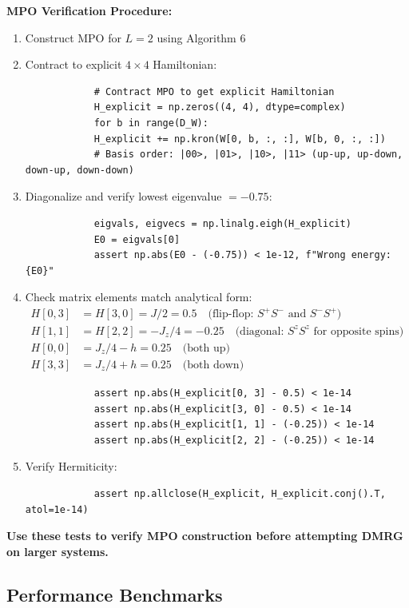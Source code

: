 \documentclass[aps,prb,onecolumn,scriptaddress]{revtex4-2}
\begin{document}
		\textbf{MPO Verification Procedure:}
		\begin{enumerate}
		\item Construct MPO for $L=2$ using Algorithm 6
		\item Contract to explicit $4 \times 4$ Hamiltonian:
		\begin{verbatim}
			# Contract MPO to get explicit Hamiltonian
			H_explicit = np.zeros((4, 4), dtype=complex)
			for b in range(D_W):
			H_explicit += np.kron(W[0, b, :, :], W[b, 0, :, :])
			# Basis order: |00>, |01>, |10>, |11> (up-up, up-down, down-up, down-down)
		\end{verbatim}
		
		\item Diagonalize and verify lowest eigenvalue $= -0.75$:
		\begin{verbatim}
			eigvals, eigvecs = np.linalg.eigh(H_explicit)
			E0 = eigvals[0]
			assert np.abs(E0 - (-0.75)) < 1e-12, f"Wrong energy: {E0}"
		\end{verbatim}
		
		\item Check matrix elements match analytical form:
		\begin{align}
			H[0,3] &= H[3,0] = J/2 = 0.5 \quad \text{(flip-flop: $S^+S^-$ and $S^-S^+$)} \\
			H[1,1] &= H[2,2] = -J_z/4 = -0.25 \quad \text{(diagonal: $S^z S^z$ for opposite spins)} \\
			H[0,0] &= J_z/4 - h = 0.25 \quad \text{(both up)} \\
			H[3,3] &= J_z/4 + h = 0.25 \quad \text{(both down)}
		\end{align}
		
		\begin{verbatim}
			assert np.abs(H_explicit[0, 3] - 0.5) < 1e-14
			assert np.abs(H_explicit[3, 0] - 0.5) < 1e-14
			assert np.abs(H_explicit[1, 1] - (-0.25)) < 1e-14
			assert np.abs(H_explicit[2, 2] - (-0.25)) < 1e-14
		\end{verbatim}
		
		\item Verify Hermiticity:
		\begin{verbatim}
			assert np.allclose(H_explicit, H_explicit.conj().T, atol=1e-14)
		\end{verbatim}
		\end{enumerate}
		
		\textbf{Use these tests to verify MPO construction before attempting DMRG on larger systems.}
		
		\subsection{Performance Benchmarks}
		
\end{document}
